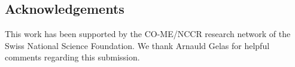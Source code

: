 \documentclass{InsightArticle}
\newcommand{\Statismo}{\emph{Statismo}\xspace}
\begin{document}



\subsection*{Acknowledgements}
This work has been supported by the CO-ME/NCCR research network of
the Swiss National Science Foundation. We thank Arnauld Gelas for helpful comments regarding this
submission. 
\end{document}
